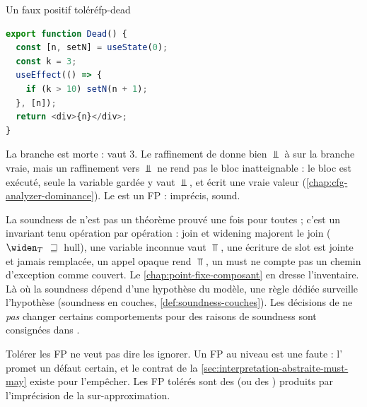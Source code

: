 \begin{exemple}{Un faux positif toléré}{fp-dead}
  \begin{lstlisting}[language=TypeScript]
export function Dead() {
  const [n, setN] = useState(0);
  const k = 3;
  useEffect(() => {
    if (k > 10) setN(n + 1);
  }, [n]);
  return <div>{n}</div>;
}
  \end{lstlisting}
  La branche est morte :  vaut 3. Le raffinement de 
  donne bien $\Bot$ à  sur la branche vraie, mais un raffinement vers
  $\Bot$ ne rend pas le bloc inatteignable : le bloc est exécuté, seule la
  variable gardée y vaut $\Bot$, et  écrit une vraie valeur
  (\cref{chap:cfg-analyzer-dominance}). Le \Warning{} est un FP : imprécis,
  sound.
\end{exemple}

\begin{remarque}
  La soundness de \reactant{} n'est pas un théorème prouvé une fois pour
  toutes ; c'est un invariant tenu opération par opération : join et widening
  majorent le join ($\widen_T$ \og $\sqsupseteq$ hull\fg{}), une variable
  inconnue vaut $\Top$, une écriture de slot est jointe et jamais remplacée, un
  appel opaque rend $\Top$, un must ne compte pas un chemin d'exception comme
  couvert. Le \cref{chap:point-fixe-composant} en dresse l'inventaire. Là où
  la soundness dépend d'une hypothèse du modèle, une règle dédiée surveille
  l'hypothèse (soundness en couches, \cref{def:soundness-couches}). Les
  décisions de ne \emph{pas} changer certains comportements pour des raisons
  de soundness sont consignées dans .
\end{remarque}

\begin{piege}
  \og Tolérer les FP\fg{} ne veut pas dire \og les ignorer\fg{}. Un FP au
  niveau \Error{} est une faute : l'\Error{} promet un défaut certain, et le
  contrat de la \cref{sec:interpretation-abstraite-must-may} existe pour
  l'empêcher. Les FP tolérés sont des \Warning{} (ou des \Info) produits par
  l'imprécision de la sur-approximation.
\end{piege}

